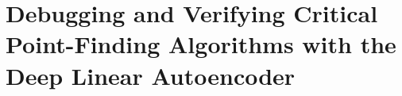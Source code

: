 \documentclass[../../thesis.tex]{subfiles}
\begin{document}
\chapter{Debugging and Verifying Critical Point-Finding Algorithms with the Deep Linear Autoencoder}

\onlyinsubfile{\printbibliography}
\end{document}
